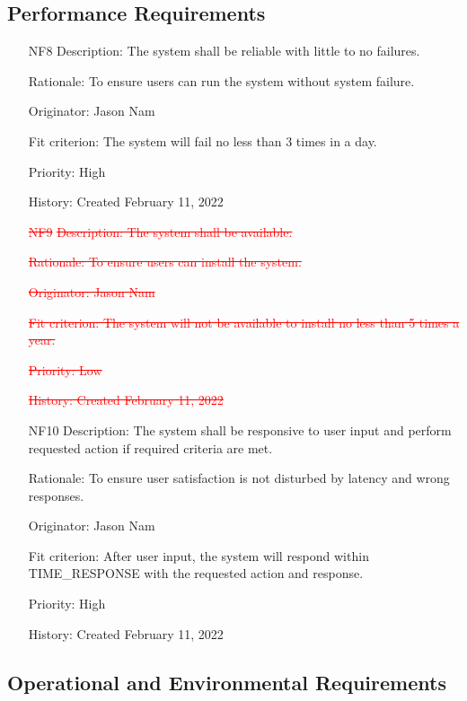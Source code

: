 \documentclass[12pt, titlepage]{article}
\begin{document}
\subsection{Performance Requirements}

\begin{itemize}
    \item[NF8]
Description: The system shall be reliable with little to no failures.

Rationale: To ensure users can run the system without system failure.

Originator: Jason Nam

Fit criterion: The system will fail no less than 3 times in a day.

Priority: High

History: Created February 11, 2022

    \item[\textcolor{red}{\st{NF9}}]
\textcolor{red}{\st{Description: The system shall be available.}}

\textcolor{red}{\st{Rationale: To ensure users can install the system.}}

\textcolor{red}{\st{Originator: Jason Nam}}

\textcolor{red}{\st{Fit criterion: The system will not be available to install no less than 5 times a year.}}

\textcolor{red}{\st{Priority: Low}}

\textcolor{red}{\st{History: Created February 11, 2022}}

    \item[NF10]
Description: The system shall be responsive to user input and perform requested action if required criteria are met.

Rationale: To ensure user satisfaction is not disturbed by latency and wrong responses.

Originator: Jason Nam

Fit criterion: After user input, the system will respond within TIME\_RESPONSE with the requested action and response.

Priority: High

History: Created February 11, 2022
\end{itemize}

\subsection{Operational and Environmental Requirements}
\end{document}
